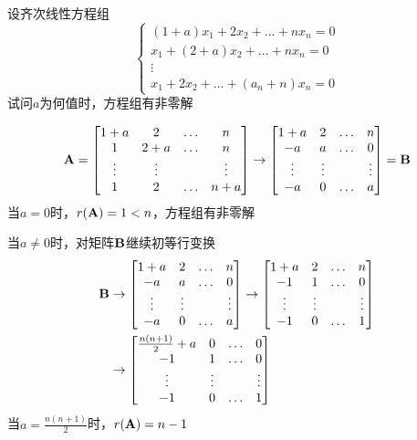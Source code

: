 \documentclass{article}
\begin{document}
\begin{examplle}[]
设齐次线性方程组
\begin{equation*}
\begin{cases}
(1+a)x_1+2x_2+\dots+nx_n=0\\
x_1+(2+a)x_2+\dots+nx_n=0\\
\vdots\\
x_1+2x_2+\dots+(a_n+n)x_n=0
\end{cases}
\end{equation*}
试问\(a\)为何值时，方程组有非零解

\begin{equation*}
\operatorname{\textbf{A}}=
\begin{bmatrix}
1+a&2&\dots&n\\
1&2+a&\dots&n\\
\vdots&\vdots&&\vdots\\
1&2&\dots&n+a
\end{bmatrix}\to
\begin{bmatrix}
1+a&2&\dots&n\\
-a&a&\dots&0\\
\vdots&\vdots&&\vdots\\
-a&0&\dots&a
\end{bmatrix}=\operatorname{\textbf{B}}
\end{equation*}
当\(a=0\)时，\(r(\operatorname{\textbf{A}})=1<n\)，方程组有非零解

当\(a\neq0\)时，对矩阵\(\operatorname{\textbf{B}}\)继续初等行变换
\begin{align*}
\operatorname{\textbf{B}}&\to
\begin{bmatrix}
1+a&2&\dots&n\\
-a&a&\dots&0\\
\vdots&\vdots&&\vdots\\
-a&0&\dots&a
\end{bmatrix}\to
\begin{bmatrix}
1+a&2&\dots&n\\
-1&1&\dots&0\\
\vdots&\vdots&&\vdots\\
-1&0&\dots&1
\end{bmatrix}\\
&\to
\begin{bmatrix}
\frac{n(n+1)}{2}+a&0&\dots&0\\
-1&1&\dots&0\\
\vdots&\vdots&&\vdots\\
-1&0&\dots&1
\end{bmatrix}
\end{align*}
当\(a=\frac{n(n+1)}{2}\)时，\(r(\operatorname{\textbf{A}})=n-1\)
\end{examplle}
\end{document}
